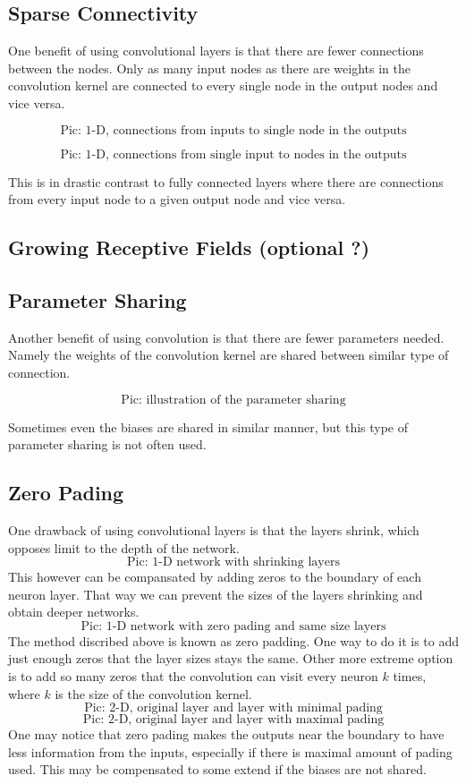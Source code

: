 \documentclass[]{article}
\begin{document}
\subsection{Sparse Connectivity}
One benefit of using convolutional layers is that there are fewer connections
between the nodes. Only as many input nodes as there are weights in the
convolution kernel are connected to every single node in the output nodes and
vice versa.

\[
\text{Pic: 1-D, connections from inputs to single node in the outputs}
\]

\[
\text{Pic: 1-D, connections from single input to nodes in the outputs}
\]

This is in drastic contrast to fully connected layers where there are connections
from every input node to a given output node and vice versa.

\subsection{Growing Receptive Fields (optional ?)}

\subsection{Parameter Sharing}
Another benefit of using convolution is that there are fewer parameters needed.
Namely the weights of the convolution kernel are shared between similar type of
connection.

\[
\text{Pic: illustration of the parameter sharing}
\]

Sometimes even the biases are shared in similar manner, but this type of
parameter sharing is not often used.

\subsection{Zero Pading}
One drawback of using convolutional layers is that the layers shrink, which
opposes limit to the depth of the network.
\[
\text{Pic: 1-D network with shrinking layers}
\]
This however can be compansated by
adding zeros to the boundary of each neuron layer. That way we can prevent the
sizes of the layers shrinking and obtain deeper networks.
\[
\text{Pic: 1-D network with zero pading and same size layers}
\]
The method discribed above is known as zero padding. One way to do it is to add
just enough zeros that the layer sizes stays the same. Other more extreme option
is to add so many zeros that the convolution can visit every neuron $k$ times,
where $k$ is the size of the convolution kernel.
\[
\text{Pic: 2-D, original layer and layer with minimal pading}
\]
\[
\text{Pic: 2-D, original layer and layer with maximal pading}
\]
One may notice that zero pading makes the outputs near the boundary to have less
information from the inputs, especially if there is maximal amount of pading
used. This may be compensated to some extend if the biases are not shared.
\end{document}
